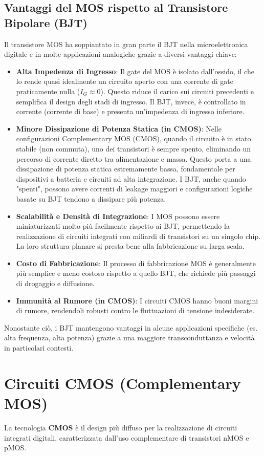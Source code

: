 \subsection{Vantaggi del MOS rispetto al Transistore Bipolare (BJT)}
Il transistore MOS ha soppiantato in gran parte il BJT nella microelettronica digitale e in molte applicazioni analogiche grazie a diversi vantaggi chiave:
\begin{itemize}
    \item \textbf{Alta Impedenza di Ingresso}: Il gate del MOS è isolato dall'ossido, il che lo rende quasi idealmente un circuito aperto con una corrente di gate praticamente nulla ($I_G \approx 0$). Questo riduce il carico sui circuiti precedenti e semplifica il design degli stadi di ingresso. Il BJT, invece, è controllato in corrente (corrente di base) e presenta un'impedenza di ingresso inferiore.
    \item \textbf{Minore Dissipazione di Potenza Statica (in CMOS)}: Nelle configurazioni Complementary MOS (CMOS), quando il circuito è in stato stabile (non commuta), uno dei transistori è sempre spento, eliminando un percorso di corrente diretto tra alimentazione e massa. Questo porta a una dissipazione di potenza statica estremamente bassa, fondamentale per dispositivi a batteria e circuiti ad alta integrazione. I BJT, anche quando "spenti", possono avere correnti di leakage maggiori e configurazioni logiche basate su BJT tendono a dissipare più potenza.
    \item \textbf{Scalabilità e Densità di Integrazione}: I MOS possono essere miniaturizzati molto più facilmente rispetto ai BJT, permettendo la realizzazione di circuiti integrati con miliardi di transistori su un singolo chip. La loro struttura planare si presta bene alla fabbricazione su larga scala.
    \item \textbf{Costo di Fabbricazione}: Il processo di fabbricazione MOS è generalmente più semplice e meno costoso rispetto a quello BJT, che richiede più passaggi di drogaggio e diffusione.
    \item \textbf{Immunità al Rumore (in CMOS)}: I circuiti CMOS hanno buoni margini di rumore, rendendoli robusti contro le fluttuazioni di tensione indesiderate.
\end{itemize}
Nonostante ciò, i BJT mantengono vantaggi in alcune applicazioni specifiche (es. alta frequenza, alta potenza) grazie a una maggiore transconduttanza e velocità in particolari contesti.

\section{Circuiti CMOS (Complementary MOS)}
La tecnologia \textbf{CMOS} è il design più diffuso per la realizzazione di circuiti integrati digitali, caratterizzata dall'uso complementare di transistori nMOS e pMOS.

